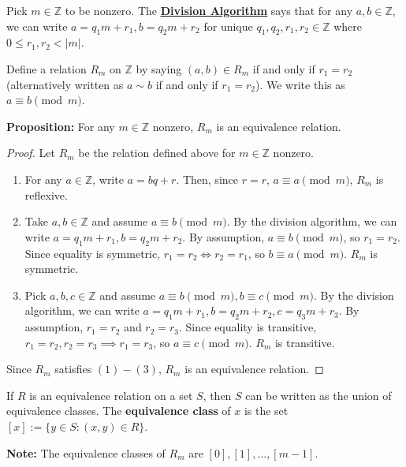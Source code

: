 \documentclass [12pt] {article}
\newcommand{\Z}{\mathbb{Z}}
\newenvironment{definition}[1]{\begin{tcolorbox}[title={Definition: #1},colback=blue!5!white,colframe=black!75!blue]}{\end{tcolorbox}}
\renewcommand{\href}[2]{\hyperref[#1]{\bf{\underline{{#2}}}}}
\renewcommand{\bf}[1]{\textbf{{#1}}}
\begin{document}
Pick $m \in \Z$ to be nonzero. The \href{thm:divalgo}{Division Algorithm} says that for any $a, b
\in \Z$, we can write $a = q_1 m + r_1, b = q_2 m + r_2$ for unique $q_1, q_2, r_1, r_2 \in \Z$
where $0 \leq r_1, r_2 < |m|$.
\begin{definition}{Modulo}
    Define a relation $R_m$ on $\Z$ by saying $(a, b) \in R_m$ if and only if $r_1 = r_2$
    (alternatively written as $a \sim b$ if and only if $r_1 = r_2$). We write this as
    $a \equiv b \pmod{m}$. 
\end{definition}
\bf{Proposition:} For any $m \in \Z$ nonzero, $R_m$ is an equivalence relation.
\begin{proof}
    Let $R_m$ be the relation defined above for $m \in \Z$ nonzero.
    \begin{enumerate}[label=(\arabic*)]
        \item For any $a \in \Z$, write $a = bq + r$. Then, since $r = r$, $a \equiv a
            \pmod{m}$, $R_m$ is reflexive.
        \item Take $a, b \in \Z$ and assume $a \equiv b \pmod{m}$. By the division algorithm,
            we can write $a = q_1 m + r_1, b = q_2 m + r_2$. By assumption, $a \equiv b \pmod{m}$, 
            so $r_1 = r_2$. Since equality is symmetric, $r_1 = r_2 \iff r_2 = r_1$, so
            $b \equiv a \pmod{m}$. $R_m$ is symmetric.
        \item Pick $a, b, c \in \Z$ and assume $a \equiv b \pmod{m}, b \equiv c \pmod{m}$.
            By the division algorithm, we can write 
            $a = q_1 m + r_1, b = q_2 m + r_2, c = q_3 m + r_3$. By assumption, $r_1 = r_2$ and
            $r_2 = r_3$. Since equality is transitive, $r_1 = r_2, r_2 = r_3 \implies r_1 = r_3$,
            so $a \equiv c \pmod{m}$. $R_m$ is transitive.
    \end{enumerate}
    \vspace{-0.5em}
    Since $R_m$ satisfies $(1)-(3)$, $R_m$ is an equivalence relation.
\end{proof}
\begin{definition}{Equivalence Class}
    If $R$ is an equivalence relation on a set $S$, then $S$ can be written as the union of
    equivalence classes. The \bf{equivalence class} of $x$ is the set 
    $[x] := \{ y \in S : (x, y) \in R \}$.
    \vspace{0.1em}

    \bf{Note:} The equivalence classes of $R_m$ are $[0], [1], \ldots, [m - 1]$.
\end{definition}
\end{document}
